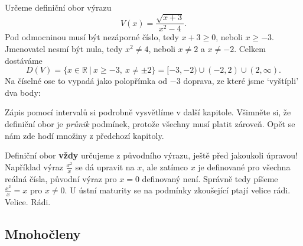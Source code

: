 \begin{example}
  Určeme definiční obor výrazu
  \begin{equation*}
    V(x) = \frac{\sqrt{x + 3}}{x^2 - 4}.
  \end{equation*}
  Pod odmocninou musí být nezáporné číslo, tedy $x + 3\geq 0$, neboli $x\geq -3$. Jmenovatel nesmí být nula, tedy $x^2\neq 4$, neboli $x\neq 2$ a $x\neq -2$. Celkem dostáváme
  \begin{equation*}
    D(V) = \{x\in\mathbb{R}\ |\ x\geq -3,\ x\neq\pm 2\} = [-3, -2)\cup(-2, 2)\cup(2, \infty).
  \end{equation*}
  Na číselné ose to vypadá jako polopřímka od $-3$ doprava, ze které jsme `vyštípli' dva body:
  \begin{center}
  \end{center}
  Zápis pomocí intervalů si podrobně vysvětlíme v další kapitole. Všimněte si, že definiční obor je \textit{průnik} podmínek, protože všechny musí platit zároveň. Opět se nám zde hodí množiny z předchozí kapitoly.
\end{example}

\begin{note}
  Definiční obor \textbf{vždy} určujeme z původního výrazu, ještě před jakoukoli úpravou! Například výraz $\frac{x^2}{x}$ se dá upravit na $x$, ale zatímco $x$ je definované pro všechna reálná čísla, původní výraz pro $x = 0$ definovaný není. Správně tedy píšeme $\frac{x^2}{x} = x$ pro $x\neq 0$. U ústní maturity se na podmínky zkoušející ptají velice rádi. Velice. Rádi.
\end{note}

\subsection{Mnohočleny}

